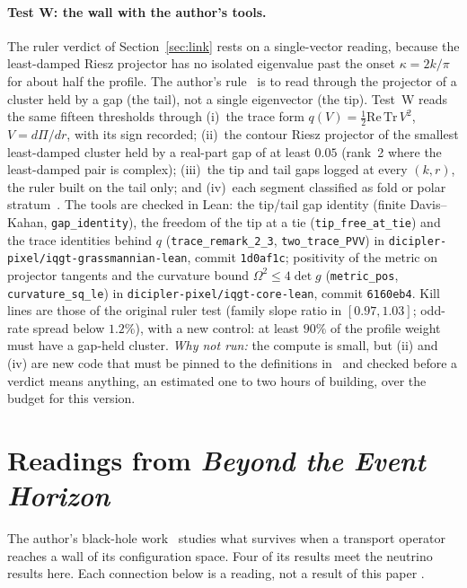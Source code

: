 \paragraph{Test W: the wall with the author's tools.} The ruler verdict of Section~\ref{sec:link} rests on a single-vector reading, because the least-damped Riesz projector has no isolated eigenvalue past the onset $\kappa=2k/\pi$ for about half the profile. The author's rule~\cite{IQGT} is to read through the projector of a cluster held by a gap (the tail), not a single eigenvector (the tip). Test~W reads the same fifteen thresholds through (i)~the trace form $q(V)=\tfrac12\mathrm{Re}\,\mathrm{Tr}\,V^2$, $V=d\Pi/dr$, with its sign recorded; (ii)~the contour Riesz projector of the smallest least-damped cluster held by a real-part gap of at least $0.05$ (rank~2 where the least-damped pair is complex); (iii)~the tip and tail gaps logged at every $(k,r)$, the ruler built on the tail only; and (iv)~each segment classified as fold or polar stratum~\cite[Prop.~8.6]{IQGT}. The tools are checked in Lean: the tip/tail gap identity (finite Davis--Kahan, \texttt{gap\_identity}), the freedom of the tip at a tie (\texttt{tip\_free\_at\_tie}) and the trace identities behind $q$ (\texttt{trace\_remark\_2\_3}, \texttt{two\_trace\_PVV}) in \texttt{dicipler-pixel/iqgt-grassmannian-lean}, commit \texttt{1d0af1c}; positivity of the metric on projector tangents and the curvature bound $\Omega^2\le4\det g$ (\texttt{metric\_pos}, \texttt{curvature\_sq\_le}) in \texttt{dicipler-pixel/iqgt-core-lean}, commit \texttt{6160eb4}. Kill lines are those of the original ruler test (family slope ratio in $[0.97,1.03]$; odd-rate spread below $1.2\%$), with a new control: at least $90\%$ of the profile weight must have a gap-held cluster. \emph{Why not run:} the compute is small, but (ii) and (iv) are new code that must be pinned to the definitions in~\cite{IQGT} and checked before a verdict means anything, an estimated one to two hours of building, over the budget for this version.

\section{Readings from \emph{Beyond the Event Horizon}}\label{sec:bhreadings}

The author's black-hole work~\cite{BH} studies what survives when a transport operator reaches a wall of its configuration space. Four of its results meet the neutrino results here. Each connection below is a reading, not a result of this paper .

